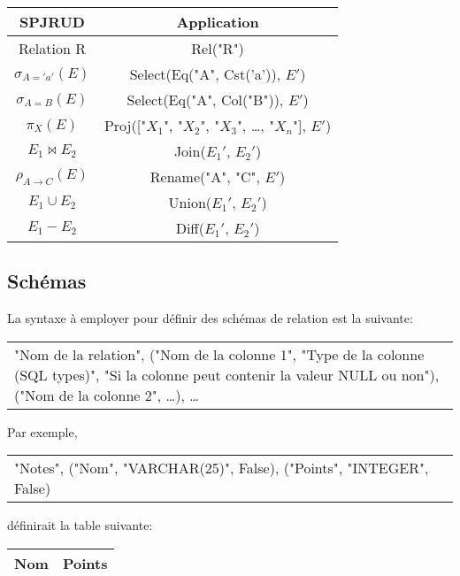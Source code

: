 \documentclass[]{article}
\begin{document}
\begin{center}
	\begin{tabular}{| c | c |}
		\hline
		\textbf{SPJRUD} & \textbf{Application}\\
		\hline
		Relation R & Rel("R")\\
		\hline
		$\sigma_{A='a'}(E)$ & Select(Eq("A", Cst('a')), $E'$)\\
		\hline
		$\sigma_{A=B}(E)$ & Select(Eq("A", Col("B")), $E'$)\\
		\hline
		$\pi_{X}(E)$ & Proj(["$X_1$", "$X_2$", "$X_3$", \ldots, "$X_n$"], $E'$)\\
		\hline
		$E_1 \bowtie E_2$ & Join($E_1'$, $E_2'$)\\
		\hline
		$\rho_{A \to C}(E)$ & Rename("A", "C", $E'$)\\
		\hline
		$E_1 \cup E_2$ & Union($E_1'$, $E_2'$)\\
		\hline
		$E_1 - E_2$ & Diff($E_1'$, $E_2'$)\\
		\hline
	\end{tabular}
\end{center}

\subsection{Sch\'emas}
La syntaxe \`a employer pour d\'efinir des sch\'emas de relation est la suivante:

\begin{center}
	\begin{tabular}{p{250px}}
		"Nom de la relation", ("Nom de la colonne 1", "Type de la colonne (SQL types)", "Si la colonne peut contenir la valeur NULL ou non"), ("Nom de la colonne 2", \ldots), \ldots
	\end{tabular}
\end{center}

Par exemple,
\begin{center}
	\begin{tabular}{p{250px}}
		"Notes", ("Nom", "VARCHAR(25)", False), ("Points", "INTEGER", False)
	\end{tabular}
\end{center}

d\'efinirait la table suivante:
\begin{center}
	\begin{tabular}{| c | c |}
		\hline
		\textbf{Nom} & \textbf{Points}\\
		\hline
	\end{tabular}
\end{center}
\end{document}

